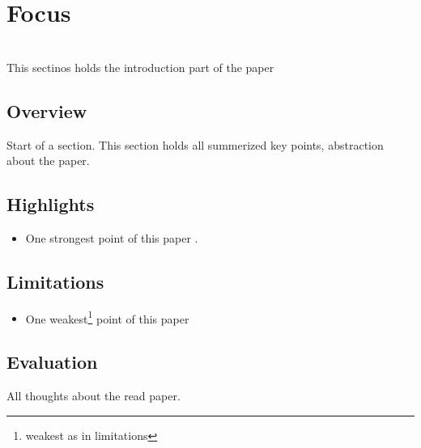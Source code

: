 \section{Focus}

 \\
This sectinos holds the introduction part of the paper
\subsection{Overview}
Start of a section. This section holds all summerized key points, abstraction about the paper.

\subsection{Highlights}
\begin{itemize}
    \item One strongest point of this paper\cite{kantorCharacteristics5GWireless2016} .
\end{itemize}

\subsection{Limitations}
\begin{itemize}
    \item One weakest\footnote{weakest as in limitations} point of this paper
\end{itemize}

\subsection{Evaluation}
All thoughts about the read paper.
